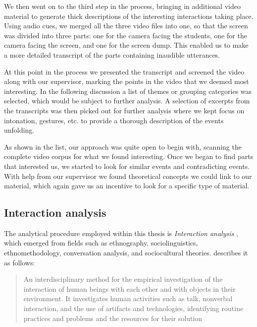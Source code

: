 We then went on to the third step in the process, bringing in additional video material to generate thick descriptions of the interesting interactions taking place. Using audio cues, we merged all the three video files into one, so that the screen was divided into three parts: one for the camera facing the students, one for the camera facing the screen, and one for the screen dump. This enabled us to make a more detailed transcript of the parts containing inaudible utterances.

At this point in the process we presented the transcript and screened the video along with our supervisor, marking the points in the video that we deemed most interesting. In the following discussion a list of themes or grouping categories was selected, which would be subject to further analysis. A selection of excerpts from the transcripts was then picked out for further analysis where we kept focus on intonation, gestures, etc. to provide a thorough description of the events unfolding. 

As shown in the list, our approach was quite open to begin with, scanning the complete video corpus for what we found interesting. Once we began to find parts that interested us, we started to look for similar events and contradicting events. With help from our supervisor we found theoretical concepts we could link to our material, which again gave us an incentive to look for a specific type of material.

\subsection{Interaction analysis}
The analytical procedure employed within this thesis is \emph{Interaction analysis} \citep{jordan1995interaction}, which emerged from fields such as ethnography, sociolinguistics, ethnomethodology, conversation analysis, and sociocultural theories. \citeauthor{jordan1995interaction} describes it as follows:

\begin{quote}
An interdisciplinary method for the empirical investigation of the interaction of human
beings with each other and with objects in their environment. It investigates human
activities such as talk, nonverbal interaction, and the use of artifacts and technologies,
identifying routine practices and problems and the resources for their solution \citep[p39]{jordan1995interaction}
\end{quote}

